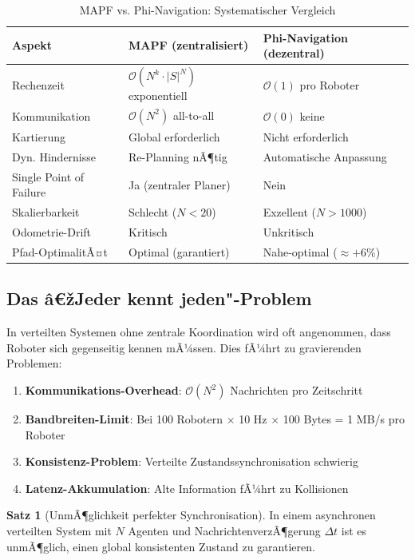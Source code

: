 ﻿\documentclass[a4paper,12pt]{article}
\theoremstyle{definition}
\newtheorem{satz}{Satz}
\begin{document}
\begin{table}[H]
	\centering
	\caption{MAPF vs. Phi-Navigation: Systematischer Vergleich}
	\label{tab:mapf_vs_phi}
	\begin{tabular}{p{4cm}p{5cm}p{5cm}}
		\toprule
		\textbf{Aspekt} & \textbf{MAPF (zentralisiert)} & \textbf{Phi-Navigation (dezentral)} \\
		\midrule
		Rechenzeit & $\mathcal{O}(N^k \cdot |S|^N)$ exponentiell & $\mathcal{O}(1)$ pro Roboter \\
		Kommunikation & $\mathcal{O}(N^2)$ all-to-all & $\mathcal{O}(0)$ keine \\
		Kartierung & Global erforderlich & Nicht erforderlich \\
		Dyn. Hindernisse & Re-Planning nÃ¶tig & Automatische Anpassung \\
		Single Point of Failure & Ja (zentraler Planer) & Nein \\
		Skalierbarkeit & Schlecht ($N < 20$) & Exzellent ($N > 1000$) \\
		Odometrie-Drift & Kritisch & Unkritisch \\
		Pfad-OptimalitÃ¤t & Optimal (garantiert) & Nahe-optimal ($\approx +6\%$) \\
		\bottomrule
	\end{tabular}
\end{table}

\subsection{Das â€žJeder kennt jeden"-Problem}

In verteilten Systemen ohne zentrale Koordination wird oft angenommen, dass Roboter sich gegenseitig kennen mÃ¼ssen. Dies fÃ¼hrt zu gravierenden Problemen:

\begin{enumerate}
	\item \textbf{Kommunikations-Overhead}: $\mathcal{O}(N^2)$ Nachrichten pro Zeitschritt
	\item \textbf{Bandbreiten-Limit}: Bei 100 Robotern $\times$ 10 Hz $\times$ 100 Bytes = 1 MB/s pro Roboter
	\item \textbf{Konsistenz-Problem}: Verteilte Zustandssynchronisation schwierig
	\item \textbf{Latenz-Akkumulation}: Alte Information fÃ¼hrt zu Kollisionen
\end{enumerate}

\begin{satz}[UnmÃ¶glichkeit perfekter Synchronisation]
	In einem asynchronen verteilten System mit $N$ Agenten und NachrichtenverzÃ¶gerung $\Delta t$ ist es unmÃ¶glich, einen global konsistenten Zustand zu garantieren.
\end{satz}
\end{document}
